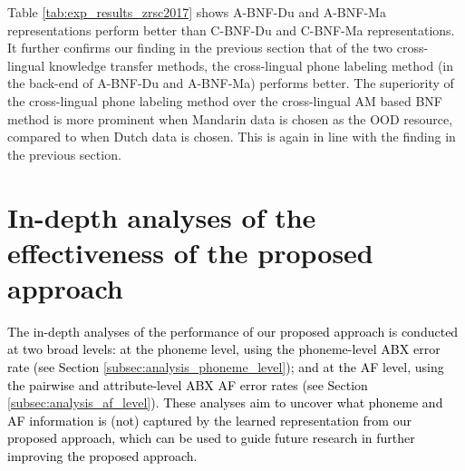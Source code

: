 \documentclass[transmag]{IEEEtran}
\begin{document}
Table \ref{tab:exp_results_zrsc2017}   shows
A-BNF-Du and A-BNF-Ma representations  perform better than C-BNF-Du and C-BNF-Ma representations. It  further confirms our finding in the previous section that of the two cross-lingual knowledge transfer methods, the cross-lingual phone labeling method (in the back-end of A-BNF-Du and A-BNF-Ma) performs better. The superiority of the cross-lingual phone labeling method over the cross-lingual AM based BNF method is more prominent when Mandarin data is chosen as the OOD resource, compared to when Dutch data is chosen. This is again in line with the finding in the previous section.




\section{In-depth analyses  of the effectiveness of the proposed approach}
\label{sec:analysis_on_results}
\textcolor{black}{The in-depth analyses of the performance of our proposed approach is conducted at two broad levels: at the phoneme level, using the phoneme-level ABX error rate (see Section \ref{subsec:analysis_phoneme_level}); and at the AF level, using the pairwise and attribute-level ABX AF error rates (see Section \ref{subsec:analysis_af_level}). 
These analyses aim to uncover what phoneme and AF information is (not) captured by the learned representation from our proposed approach, which can be used to guide future research in further improving  the proposed approach.
}
\end{document}
